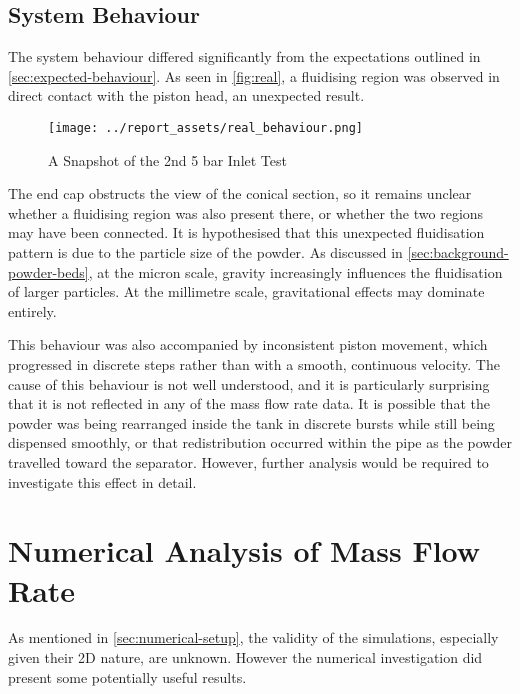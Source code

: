 \subsection{System Behaviour}
The system behaviour differed significantly from the expectations outlined in \autoref{sec:expected-behaviour}. As seen in \autoref{fig:real}, a fluidising region was observed in direct contact with the piston head, an unexpected result. 
\begin{figure}[htbp]
    \centering
    
    \begin{minipage}{0.6\textwidth}
        \centering
        \texttt{[image: ../report\_assets/real\_behaviour.png]}
        \caption{A Snapshot of the 2nd 5 bar Inlet Test}\label{fig:real}
    \end{minipage}
    
\end{figure}
The end cap obstructs the view of the conical section, so it remains unclear whether a fluidising region was also present there, or whether the two regions may have been connected. It is hypothesised that this unexpected fluidisation pattern is due to the particle size of the powder. As discussed in \autoref{sec:background-powder-beds}, at the micron scale, gravity increasingly influences the fluidisation of larger particles. At the millimetre scale, gravitational effects may dominate entirely.

This behaviour was also accompanied by inconsistent piston movement, which progressed in discrete steps rather than with a smooth, continuous velocity. The cause of this behaviour is not well understood, and it is particularly surprising that it is not reflected in any of the mass flow rate data. It is possible that the powder was being rearranged inside the tank in discrete bursts while still being dispensed smoothly, or that redistribution occurred within the pipe as the powder travelled toward the separator. However, further analysis would be required to investigate this effect in detail.

\section{Numerical Analysis of Mass Flow Rate}
As mentioned in \autoref{sec:numerical-setup}, the validity of the simulations, especially given their 2D nature, are unknown. However the numerical investigation did present some potentially useful results.

